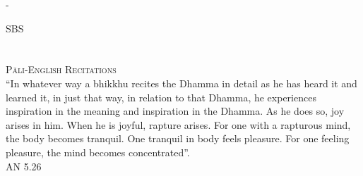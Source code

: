 
\cleartorecto
\thispagestyle{empty}
  -\vspace*{3em}

{\centering


    {\Huge\fontsize{64}{16}\sbsFont SBS}\\[1.0\baselineskip]%

    {\Huge\chapterTitleFont\textsc{{\thesubtitle\linebreak}}}\\[0.2\baselineskip]

      \\[1.4\baselineskip]


  {\fontsize{10.5}{12}\scshape Pāli-English Recitations}\\[2.5\baselineskip]

  {\quote ``In whatever way a bhikkhu recites the Dhamma in detail as he has heard it and learned it, in just that way, in relation to that Dhamma, he experiences inspiration in the meaning and inspiration in the Dhamma. As he does so, joy arises in him. When he is joyful, rapture arises. For one with a rapturous mind, the body becomes tranquil. One tranquil in body feels pleasure. For one feeling pleasure, the mind becomes concentrated''.\\}\medskip\tiny AN 5.26\\[1.4\baselineskip]
}


